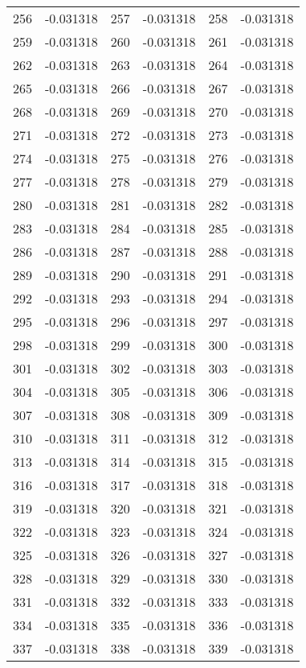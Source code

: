 \documentclass[12pt]{article}
\begin{document}
\begin{longtable}{@{}cc|cc|cc@{}}
256 & -0.031318 & 257 & -0.031318 & 258 & -0.031318 \\
259 & -0.031318 & 260 & -0.031318 & 261 & -0.031318 \\
262 & -0.031318 & 263 & -0.031318 & 264 & -0.031318 \\
265 & -0.031318 & 266 & -0.031318 & 267 & -0.031318 \\
268 & -0.031318 & 269 & -0.031318 & 270 & -0.031318 \\
271 & -0.031318 & 272 & -0.031318 & 273 & -0.031318 \\
274 & -0.031318 & 275 & -0.031318 & 276 & -0.031318 \\
277 & -0.031318 & 278 & -0.031318 & 279 & -0.031318 \\
280 & -0.031318 & 281 & -0.031318 & 282 & -0.031318 \\
283 & -0.031318 & 284 & -0.031318 & 285 & -0.031318 \\
286 & -0.031318 & 287 & -0.031318 & 288 & -0.031318 \\
289 & -0.031318 & 290 & -0.031318 & 291 & -0.031318 \\
292 & -0.031318 & 293 & -0.031318 & 294 & -0.031318 \\
295 & -0.031318 & 296 & -0.031318 & 297 & -0.031318 \\
298 & -0.031318 & 299 & -0.031318 & 300 & -0.031318 \\
301 & -0.031318 & 302 & -0.031318 & 303 & -0.031318 \\
304 & -0.031318 & 305 & -0.031318 & 306 & -0.031318 \\
307 & -0.031318 & 308 & -0.031318 & 309 & -0.031318 \\
310 & -0.031318 & 311 & -0.031318 & 312 & -0.031318 \\
313 & -0.031318 & 314 & -0.031318 & 315 & -0.031318 \\
316 & -0.031318 & 317 & -0.031318 & 318 & -0.031318 \\
319 & -0.031318 & 320 & -0.031318 & 321 & -0.031318 \\
322 & -0.031318 & 323 & -0.031318 & 324 & -0.031318 \\
325 & -0.031318 & 326 & -0.031318 & 327 & -0.031318 \\
328 & -0.031318 & 329 & -0.031318 & 330 & -0.031318 \\
331 & -0.031318 & 332 & -0.031318 & 333 & -0.031318 \\
334 & -0.031318 & 335 & -0.031318 & 336 & -0.031318 \\
337 & -0.031318 & 338 & -0.031318 & 339 & -0.031318 \\

\end{longtable}
\end{document}
